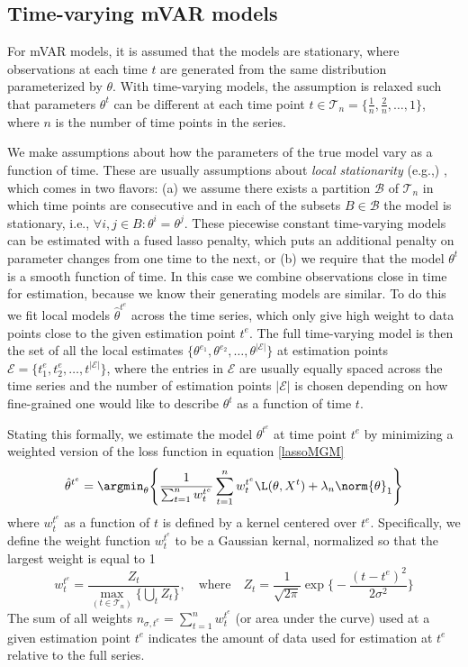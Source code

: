 \subsection{Time-varying mVAR models}
For mVAR models, it is assumed that the models are stationary, where observations at each time $t$ are generated from the same distribution parameterized by $\theta$. With time-varying models, the assumption is relaxed such that parameters $\theta^t$ can be different at each time point $t \in \mathcal{T}_n = \{\frac{1}{n},\frac{2}{n},\ldots,1\}$, where $n$ is the number of time points in the series. 

We make assumptions about how the parameters of the true model vary as a function of time. These are usually assumptions about \textit{local stationarity} (e.g.,) \cite{zhou2010time}, which comes in two flavors: (a) we assume there exists a partition $\mathcal{B}$ of $\mathcal{T}_n$ in which time points are consecutive and in each of the subsets $B \in \mathcal{B}$ the model is stationary, i.e., $\forall i,j \in B : \theta^i = \theta^j$. These piecewise constant time-varying models can be estimated with a fused lasso penalty, which puts an additional penalty on parameter changes from one time to the next, or (b) we require that the model $\theta^t$ is a smooth function of time. In this case we combine observations close in time for estimation, because we know their generating models are similar. To do this we fit local models $\hat{\theta}^{t^e}$ across the time series, which only give high weight to data points close to the given estimation point $t^e$. The full time-varying model is then the set of all the local estimates $\{\theta^{e_1},\theta^{e_2},\ldots,\theta^{|\mathcal{E}|}\}$ at estimation points $\mathcal{E} = \{t_1^e,t_2^e,\ldots,t^{|\mathcal{E}|}\}$, where the entries in $\mathcal{E}$ are usually equally spaced across the time series and the number of estimation points $|\mathcal{E}|$ is chosen depending on how fine-grained one would like to describe $\theta^t$ as a function of time $t$.

Stating this formally, we estimate the model $\theta^{t^e}$ at time point $t^e$ by minimizing a weighted version of the loss function in equation \ref{lassoMGM}
\begin{equation} \label{lassoTV}
    \hat{\theta}^{t^e} = \argmin_{\theta} \Bigg\{\frac{1}{\sum_{t=1}^{n} w_t^{t^e}} \sum_{t=1}^n w_t^{t^e} \L(\theta,X^t) + \lambda_n \norm{\theta}_1 \Bigg\}
\end{equation}
where $w_t^{t^e}$ as a function of $t$ is defined by a kernel centered over $t^e$. Specifically, we define the weight function $w_t^{t^e}$ to be a Gaussian kernal, normalized so that the largest weight is equal to 1 \cite{zhou2010time}
\begin{equation} \label{weight}
    w_t^{t^e} = \frac{Z_t}{\max_{(t\in\mathcal{T}_n)} \{\bigcup_t Z_t\}}, \quad \text{where} \quad Z_t = \frac{1}{\sqrt{2\pi}} \exp \Bigg\{-\frac{(t-t^e)^2}{2\sigma^2}\Bigg\}
\end{equation}
The sum of all weights $n_{\sigma,t^e} = \sum_{t=1}^n w_t^{t^e}$ (or area under the curve) used at a given estimation point $t^e$ indicates the amount of data used for estimation at $t^e$ relative to the full series.